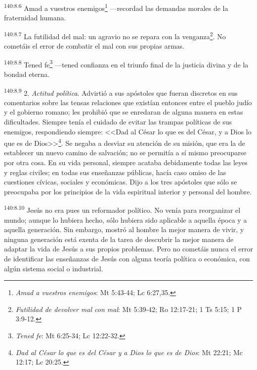 \par 
\textsuperscript{140:8.6} Amad a vuestros enemigos\footnote{\textit{Amad a vuestros enemigos}: Mt 5:43-44; Lc 6:27,35.} ---recordad las demandas morales de la fraternidad humana.

\par 
\textsuperscript{140:8.7} La futilidad del mal: un agravio no se repara con la venganza\footnote{\textit{Futilidad de devolver mal con mal}: Mt 5:39-42; Ro 12:17-21; 1 Ts 5:15; 1 P 3:9-12.}. No cometáis el error de combatir el mal con sus propias armas.

\par 
\textsuperscript{140:8.8} Tened fe\footnote{\textit{Tened fe}: Mt 6:25-34; Lc 12:22-32.} ---tened confianza en el triunfo final de la justicia divina y de la bondad eterna.

\par 
\textsuperscript{140:8.9} 2. \textit{Actitud política}. Advirtió a sus apóstoles que fueran discretos en sus comentarios sobre las tensas relaciones que existían entonces entre el pueblo judío y el gobierno romano; les prohibió que se enredaran de alguna manera en estas dificultades. Siempre tenía el cuidado de evitar las trampas políticas de sus enemigos, respondiendo siempre: <<Dad al César lo que es del César, y a Dios lo que es de Dios>>\footnote{\textit{Dad al César lo que es del César y a Dios lo que es de Dios}: Mt 22:21; Mc 12:17; Lc 20:25.}. Se negaba a desviar su atención de su misión, que era la de establecer un nuevo camino de salvación; no se permitía a sí mismo preocuparse por otra cosa. En su vida personal, siempre acataba debidamente todas las leyes y reglas civiles; en todas sus enseñanzas públicas, hacía caso omiso de las cuestiones cívicas, sociales y económicas. Dijo a los tres apóstoles que sólo se preocupaba por los principios de la vida espiritual interior y personal del hombre.

\par 
\textsuperscript{140:8.10} Jesús no era pues un reformador político. No venía para reorganizar el mundo; aunque lo hubiera hecho, sólo hubiera sido aplicable a aquella época y a aquella generación. Sin embargo, mostró al hombre la mejor manera de vivir, y ninguna generación está exenta de la tarea de descubrir la mejor manera de adaptar la vida de Jesús a sus propios problemas. Pero no cometáis nunca el error de identificar las enseñanzas de Jesús con alguna teoría política o económica, con algún sistema social o industrial.

